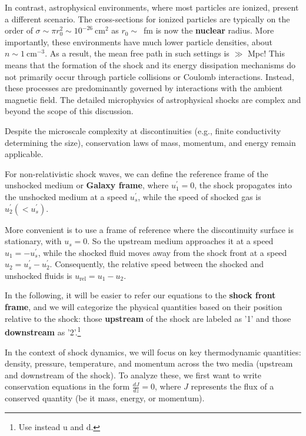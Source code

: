 In contrast, astrophysical environments, where most particles are ionized, present a different scenario. The cross-sections for ionized particles are typically on the order of \( \sigma \sim \pi r_0^2 \sim 10^{-26}~\text{cm}^2 \) as $r_0 \sim$~fm is now the \textbf{nuclear} radius.
%
More importantly, these environments have much lower particle densities, about \( n \sim 1~\text{cm}^{-3} \). As a result, the mean free path in such settings is \( \gg \) Mpc! 
%
This means that the formation of the shock and its energy dissipation mechanisms do not primarily occur through particle collisions or Coulomb interactions. Instead, these processes are predominantly governed by interactions with the ambient magnetic field. The detailed microphysics of astrophysical shocks are complex and beyond the scope of this discussion.

Despite the microscale complexity at discontinuities (e.g., finite conductivity determining the size), conservation laws of mass, momentum, and energy remain applicable.

For non-relativistic shock waves, we can define the reference frame of the unshocked medium or \textbf{Galaxy frame}, where \( u^\prime_1 = 0 \),
the shock propagates into the unshocked medium at a speed \( u^\prime_s \), while the speed of shocked gas is \( u^\prime_2 (< u^\prime_s) \).

More convenient is to use a frame of reference  where the discontinuity surface is stationary, with \( u_s = 0 \). So the upstream medium approaches it at a speed \( u_1 = -u^\prime_s \), while the shocked fluid moves away from the shock front at a speed \( u_2 = u^\prime_s - u^\prime_2 \).
%
Consequently, the relative speed between the shocked and unshocked fluids is \( u_{\text{rel}} = u_1 - u_2 \).

In the following, it will be easier to refer our equations to the \textbf{shock front frame}, and we will categorize the physical quantities based on their position relative to the shock: those \textbf{upstream} of the shock are labeled as '1' and those \textbf{downstream} as '2'.\footnote{Use instead u and d.}

In the context of shock dynamics, we will focus on key thermodynamic quantities: density, pressure, temperature, and momentum across the two media (upstream and downstream of the shock). To analyze these, we first want to write conservation equations in the form \( \frac{dJ}{dz} = 0 \), where \( J \) represents the flux of a conserved quantity (be it mass, energy, or momentum).

